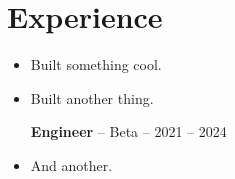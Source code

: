 \documentclass[letterpaper,10pt]{article}
\newcommand{\achievement}[3]{\textbf{#1} -- #2 -- #3}
\begin{document}
\section{Experience}
\begin{itemize}
  \achievement{Senior Engineer}{Acme}{2024 -- Present}
  \item Built something cool.
  \item Built another thing.

  \achievement{Engineer}{Beta}{2021 -- 2024}
  \item And another.
\end{itemize}
\end{document}
